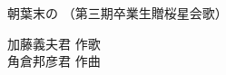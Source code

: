 \documentclass[10pt,b5j]{tarticle} %
\begin{document}
\begin{minipage}[c]{0.7\hsize} %
    \begin{center}
        {\LARGE
            朝葉末の %
        }
        {\small 
            （第三期卒業生贈桜星会歌） %
        }
    \end{center}
\end{minipage}
\begin{minipage}[c]{0.3\hsize} %
    \begin{flushright} %
        加藤義夫君 作歌\\角倉邦彦君 作曲 %
    \end{flushright}
\end{minipage}
\end{document}
